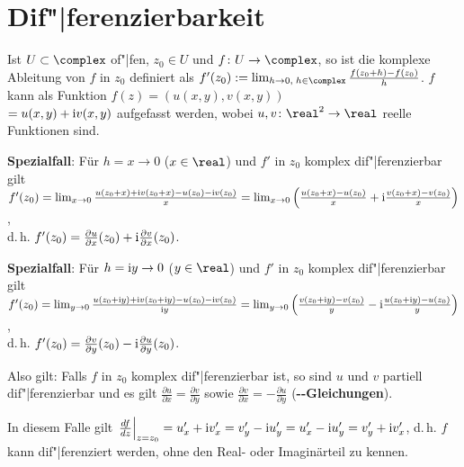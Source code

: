 \pagebreak

\section{%
    Dif"|ferenzierbarkeit%
}

Ist $U \subset \complex$ of"|fen, $z_0 \in U$ und
$f\colon U \rightarrow \complex$, so ist die komplexe Ableitung von $f$ in
$z_0$ definiert als
$f'(z_0) := \lim_{h \to 0,\; h \in \complex} \frac{f(z_0 + h) - f(z_0)}{h}$.
$f$ kann als Funktion $f(z) = (u(x, y), v(x, y))$\\
$= u(x, y) + \mathrm{i} v(x, y)$
aufgefasst werden, wobei $u, v\colon \real^2 \rightarrow \real$ reelle
Funktionen sind.

\linie

\textbf{Spezialfall}:
Für $h = x \to 0$ ($x \in \real$) und
$f'$ in $z_0$ komplex dif"|ferenzierbar gilt\\
$f'(z_0)
= \lim_{x \to 0} \frac{u(z_0 + x) + \mathrm{i} v(z_0 + x) - u(z_0) - \mathrm{i} v(z_0)}{x}
= \lim_{x \to 0} \left(\frac{u(z_0 + x) - u(z_0)}{x} +
\mathrm{i} \frac{v(z_0 + x) - v(z_0)}{x}\right)$,\\
d.\,h. $f'(z_0) = \frac{\partial u}{\partial x}(z_0) +
\mathrm{i} \frac{\partial v}{\partial x}(z_0)$.

\textbf{Spezialfall}:
Für $h = \mathrm{i} y \to 0$ ($y \in \real$) und
$f'$ in $z_0$ komplex dif"|ferenzierbar gilt\\
$f'(z_0)
= \lim_{y \to 0} \frac{u(z_0 + \mathrm{i} y) + \mathrm{i} v(z_0 + \mathrm{i} y) -
u(z_0) - \mathrm{i} v(z_0)}{\mathrm{i} y}
= \lim_{y \to 0} \left(\frac{v(z_0 + \mathrm{i} y) - v(z_0)}{y} -
\mathrm{i} \frac{u(z_0 + \mathrm{i} y) - u(z_0)}{y}\right)$,\\
d.\,h. $f'(z_0) = \frac{\partial v}{\partial y}(z_0) -
\mathrm{i} \frac{\partial u}{\partial y}(z_0)$.

\linie

Also gilt:
Falls $f$ in $z_0$ komplex dif"|ferenzierbar ist, so sind $u$ und $v$ partiell
dif"|ferenzierbar und es gilt
$\frac{\partial u}{\partial x} = \frac{\partial v}{\partial y}$ sowie
$\frac{\partial v}{\partial x} = -\frac{\partial u}{\partial y}$
(\textbf{--Gleichungen}).

In diesem Falle gilt $\left.\frac{df}{dz}\right|_{z=z_0} = u_x' + \mathrm{i} v_x' =
v_y' - \mathrm{i} u_y' = u_x' - \mathrm{i} u_y' = v_y' + \mathrm{i} v_x'$, d.\,h. $f$ kann
dif"|ferenziert werden, ohne den Real- oder Imaginärteil zu kennen.

\linie

